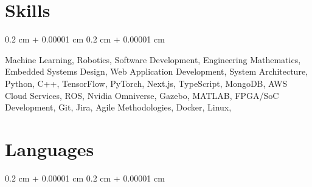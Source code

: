 \documentclass[10pt, letterpaper]{article}
\newenvironment{onecolentry}{
\begin{adjustwidth}{
0.2 cm + 0.00001 cm
}{
0.2 cm + 0.00001 cm
}
}{
\end{adjustwidth}
} %
\begin{document}
\section{Skills}
\begin{onecolentry}

{Machine Learning}, 
{Robotics}, 
{Software Development}, 
{Engineering Mathematics}, 
{Embedded Systems Design}, 
{Web Application Development}, 
{System Architecture}, 
{Python}, 
{C++}, 
{TensorFlow}, 
{PyTorch}, 
{Next.js}, 
{TypeScript}, 
{MongoDB}, 
{AWS Cloud Services}, 
{ROS}, 
{Nvidia Omniverse}, 
{Gazebo}, 
{MATLAB}, 
{FPGA/SoC Development}, 
{Git}, 
{Jira}, 
{Agile Methodologies}, 
{Docker}, 
{Linux}, 
\end{onecolentry}

\section{Languages}
\begin{onecolentry}

\end{onecolentry}
\end{document}
